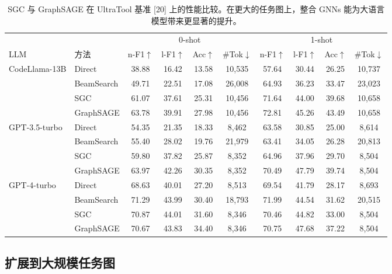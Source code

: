 \documentclass[11pt,UTF8,fontset=fandol]{ctexart}
\begin{document}
\begin{table}[H]\centering
\caption{SGC 与 GraphSAGE 在 UltraTool 基准 [20] 上的性能比较。在更大的任务图上，整合 GNNs 能为大语言模型带来更显著的提升。}
\label{tab:3}
\small
\setlength{\tabcolsep}{4pt}
\begin{tabular}{llcccc cccc}
\toprule
& & \multicolumn{4}{c}{0-shot} & \multicolumn{4}{c}{1-shot}\\
\cmidrule(lr){3-6}\cmidrule(lr){7-10}
LLM & 方法 & n-F1$\uparrow$ & l-F1$\uparrow$ & Acc$\uparrow$ & \#Tok$\downarrow$ & n-F1$\uparrow$ & l-F1$\uparrow$ & Acc$\uparrow$ & \#Tok$\downarrow$\\
\midrule
\multirow{4}{*}{CodeLlama-13B}
& Direct & 38.88 & 16.42 & 13.58 & 10{,}535 & 57.64 & 30.44 & 26.25 & 10{,}737\\
& BeamSearch & 49.71 & 22.51 & 17.08 & 26{,}008 & 64.93 & 36.23 & 33.47 & 23{,}023\\
& SGC & 61.07 & 37.61 & 25.31 & 10{,}456 & 71.64 & 44.00 & 39.68 & 10{,}658\\
& GraphSAGE & 63.78 & 39.91 & 27.98 & 10{,}456 & 72.81 & 45.26 & 43.49 & 10{,}658\\
\midrule
\multirow{4}{*}{GPT-3.5-turbo}
& Direct & 54.35 & 21.35 & 18.33 & 8{,}462 & 63.58 & 30.85 & 25.00 & 8{,}614\\
& BeamSearch & 55.40 & 28.02 & 19.76 & 21{,}979 & 63.41 & 34.05 & 26.28 & 20{,}813\\
& SGC & 59.80 & 37.82 & 25.87 & 8{,}352 & 64.96 & 37.96 & 29.70 & 8{,}504\\
& GraphSAGE & 63.97 & 42.26 & 30.35 & 8{,}352 & 70.49 & 47.79 & 39.74 & 8{,}504\\
\midrule
\multirow{4}{*}{GPT-4-turbo}
& Direct & 68.63 & 40.01 & 27.20 & 8{,}513 & 69.54 & 41.79 & 28.17 & 8{,}693\\
& BeamSearch & 71.29 & 43.99 & 30.40 & 18{,}793 & 71.99 & 44.54 & 31.62 & 20{,}515\\
& SGC & 70.87 & 44.01 & 31.60 & 8{,}346 & 70.46 & 44.82 & 33.00 & 8{,}504\\
& GraphSAGE & 70.67 & 43.83 & 34.40 & 8{,}346 & 70.75 & 47.68 & 37.22 & 8{,}504\\
\bottomrule
\end{tabular}
\end{table}

\subsection{扩展到大规模任务图}
\end{document}
